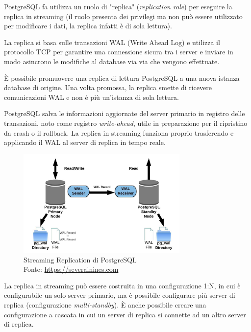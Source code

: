 PostgreSQL fa utilizza un ruolo di "replica" (\textit{replication role}) per eseguire la replica in streaming (il ruolo presenta dei privilegi ma non può essere utilizzato per modificare i dati, la replica infatti è di sola lettura).

La replica si basa sulle transazioni WAL (Write Ahead Log) e utilizza il protocollo TCP per garantire una connessione sicura tra i server e inviare in modo asincrono le modifiche al database via via che vengono effettuate.

È possibile promuovere una replica di lettura PostgreSQL a una nuova istanza database di origine. Una volta promossa, la replica smette di ricevere comunicazioni WAL e non è più un'istanza di sola lettura.

PostgreSQL salva le informazioni aggiornate del server primario in registro delle transazioni, noto come registro \textit{write-ahead}, utile in preparazione per il ripristino da crash o il rollback. La replica in streaming funziona proprio trasferendo e applicando il WAL al server di replica in tempo reale.

\begin{figure}[H]
\centering
\captionsetup{justification=centering}
\includegraphics[width=0.75\textwidth,height=\textheight,keepaspectratio]{img/streaming_replication.jpg}
\caption{Streaming Replication di PostgreSQL\\Fonte: \url{https://severalnines.com}}
\label{fig:streaming-replication}
\end{figure}

La replica in streaming può essere costruita in una configurazione 1:N, in cui è configurabile un solo server primario, ma è possibile configurare più server di replica (configurazione \textit{multi-standby}). È anche possibile creare una configurazione a cascata in cui un server di replica si connette ad un altro server di replica.

